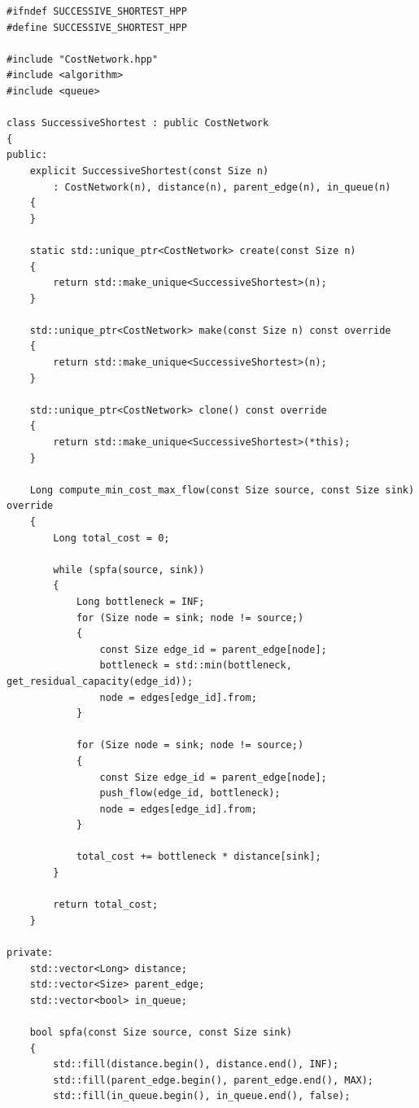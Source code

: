 \newpage

\label{ap:successive_shortest}

\begin{lstlisting}[caption={Implementação em C++ do algoritmo \textit{Successive Shortest Path} com SPFA.}, label={lst:successive_shortest}]
#ifndef SUCCESSIVE_SHORTEST_HPP
#define SUCCESSIVE_SHORTEST_HPP

#include "CostNetwork.hpp"
#include <algorithm>
#include <queue>

class SuccessiveShortest : public CostNetwork
{
public:
	explicit SuccessiveShortest(const Size n)
	    : CostNetwork(n), distance(n), parent_edge(n), in_queue(n)
	{
	}

	static std::unique_ptr<CostNetwork> create(const Size n)
	{
		return std::make_unique<SuccessiveShortest>(n);
	}

	std::unique_ptr<CostNetwork> make(const Size n) const override
	{
		return std::make_unique<SuccessiveShortest>(n);
	}

	std::unique_ptr<CostNetwork> clone() const override
	{
		return std::make_unique<SuccessiveShortest>(*this);
	}

	Long compute_min_cost_max_flow(const Size source, const Size sink) override
	{
		Long total_cost = 0;

		while (spfa(source, sink))
		{
			Long bottleneck = INF;
			for (Size node = sink; node != source;)
			{
				const Size edge_id = parent_edge[node];
				bottleneck = std::min(bottleneck, get_residual_capacity(edge_id));
				node = edges[edge_id].from;
			}

			for (Size node = sink; node != source;)
			{
				const Size edge_id = parent_edge[node];
				push_flow(edge_id, bottleneck);
				node = edges[edge_id].from;
			}

			total_cost += bottleneck * distance[sink];
		}

		return total_cost;
	}

private:
	std::vector<Long> distance;
	std::vector<Size> parent_edge;
	std::vector<bool> in_queue;

	bool spfa(const Size source, const Size sink)
	{
		std::fill(distance.begin(), distance.end(), INF);
		std::fill(parent_edge.begin(), parent_edge.end(), MAX);
		std::fill(in_queue.begin(), in_queue.end(), false);


\end{lstlisting}
